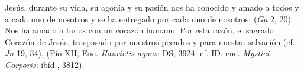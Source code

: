 	 Jesús, durante su vida, su agonía y su pasión nos ha conocido y amado a todos y a cada uno de nosotros y se ha entregado por cada uno de nosotros:  (\emph{Ga} 2, 20). Nos ha amado a todos con un corazón humano. Por esta razón, el sagrado Corazón de Jesús, traspasado por nuestros pecados y para nuestra salvación (cf. \emph{Jn} 19, 34),  (Pío XII, Enc. \emph{Haurietis aquas}: DS, 3924; cf. ID. enc. \emph{Mystici Corporis}: ibíd., 3812).